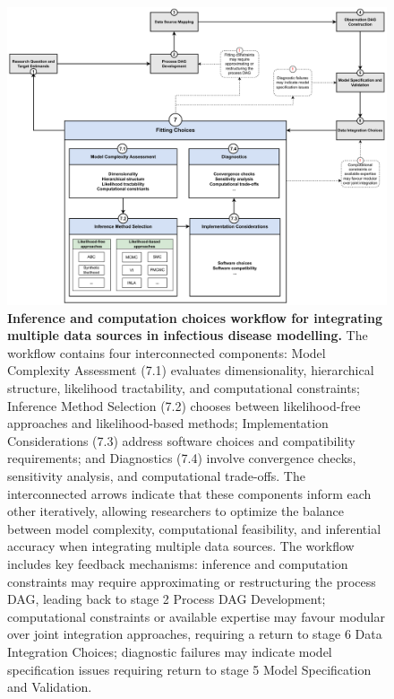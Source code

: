 \documentclass{article}
\begin{document}
\begin{figure}[htbp]
    \centering
    \includegraphics[width=\textwidth]{figures/subpanel_fitting choices.drawio.pdf}
    \caption{\textbf{Inference and computation choices workflow for integrating multiple data sources in infectious disease modelling.} The workflow contains four interconnected components: Model Complexity Assessment (7.1) evaluates dimensionality, hierarchical structure, likelihood tractability, and computational constraints; Inference Method Selection (7.2) chooses between likelihood-free approaches and likelihood-based methods; Implementation Considerations (7.3) address software choices and compatibility requirements; and Diagnostics (7.4) involve convergence checks, sensitivity analysis, and computational trade-offs. The interconnected arrows indicate that these components inform each other iteratively, allowing researchers to optimize the balance between model complexity, computational feasibility, and inferential accuracy when integrating multiple data sources. The workflow includes key feedback mechanisms: inference and computation constraints may require approximating or restructuring the process DAG, leading back to stage 2 Process DAG Development; computational constraints or available expertise may favour modular over joint integration approaches, requiring a return to stage 6 Data Integration Choices; diagnostic failures may indicate model specification issues requiring return to stage 5 Model Specification and Validation. }
    \label{fig:fitting}
\end{figure}
\end{document}
